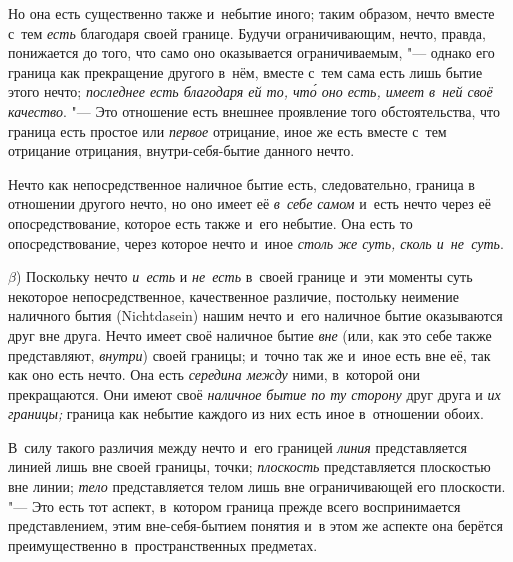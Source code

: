 Но она есть существенно также и~небытие иного; таким образом, нечто вместе
с~тем {\em есть} благодаря своей границе. Будучи ограничивающим, нечто, правда,
понижается до того, что само оно оказывается ограничиваемым, "--- однако его
граница как прекращение другого в~нём, вместе с~тем сама есть лишь бытие этого
нечто; {\em последнее есть благодаря ей то, чт\'{о} оно есть, имеет в~ней своё
качество}. "--- Это отношение есть внешнее проявление того обстоятельства, что
граница есть простое или {\em первое} отрицание, иное же есть вместе с~тем
отрицание отрицания, внутри-себя-бытие данного нечто.

Нечто как непосредственное наличное бытие есть, следовательно, граница
в отношении другого нечто, но оно имеет её {\em в~себе самом} и~есть нечто
через её опосредствование, которое есть также и~его небытие. Она есть то
опосредствование, через которое нечто и~иное
{\em столь же суть, сколь и~не~суть}.

$\beta$) Поскольку нечто {\em и~есть} и {\em не~есть} в~своей
границе и~эти моменты суть некоторое непосредственное, качественное различие,
постольку неимение наличного бытия (Nicht\-dasein) нашим нечто и~его наличное
бытие оказываются друг вне друга. Нечто имеет своё наличное бытие {\em вне}
(или, как это себе также представляют, {\em внутри}) своей границы; и~точно так
же и~иное есть вне её, так как оно есть нечто. Она есть {\em середина между}
ними, в~которой они прекращаются. Они имеют своё {\em наличное бытие по ту
сторону} друг друга и {\em их границы;} граница как небытие каждого из них есть
иное в~отношении обоих.

В~силу такого различия между нечто и~его границей {\em линия} представляется
линией лишь вне своей границы, точки; {\em плоскость} представляется плоскостью
вне линии; {\em тело} представляется телом лишь вне ограничивающей его
плоскости. "--- Это есть тот аспект, в~котором граница прежде всего
воспринимается представлением, этим вне-себя-бытием понятия и~в этом же аспекте
она берётся преимущественно в~пространственных предметах.

